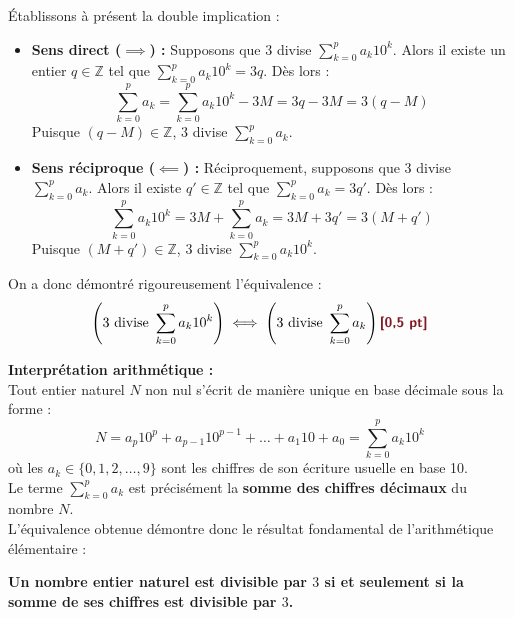 \documentclass[11pt,a4paper]{article}
\newcommand{\bareme}[1]{\hfill\textbf{\textcolor{secondary}{\sffamily[#1]}}}
\newcommand{\Z}{\mathbb{Z}}
\begin{document}
\begin{correctionbox}[Corrigé de l'Exercice 5 \bareme{Total : 4 points}]
\begin{enumerate}[label=\textbf{\arabic*.}]
    Établissons à présent la double implication :
    \begin{itemize}[leftmargin=*, label=$\bullet$]
        \item \textbf{Sens direct ($\implies$) :} Supposons que $3$ divise $\sum_{k=0}^p a_k 10^k$. Alors il existe un entier $q \in \Z$ tel que $\sum_{k=0}^p a_k 10^k = 3q$. Dès lors :
        \[
        \sum_{k=0}^p a_k = \sum_{k=0}^p a_k 10^k - 3M = 3q - 3M = 3(q - M)
        \]
        Puisque $(q - M) \in \Z$, $3$ divise $\sum_{k=0}^p a_k$.
        \item \textbf{Sens réciproque ($\impliedby$) :} Réciproquement, supposons que $3$ divise $\sum_{k=0}^p a_k$. Alors il existe $q' \in \Z$ tel que $\sum_{k=0}^p a_k = 3q'$. Dès lors :
        \[
        \sum_{k=0}^p a_k 10^k = 3M + \sum_{k=0}^p a_k = 3M + 3q' = 3(M + q')
        \]
        Puisque $(M + q') \in \Z$, $3$ divise $\sum_{k=0}^p a_k 10^k$.
    \end{itemize}
    On a donc démontré rigoureusement l'équivalence :
    \[
    \left( 3 \text{ divise } \sum_{k=0}^p a_k 10^k \right) \iff \left( 3 \text{ divise } \sum_{k=0}^p a_k \right) \bareme{0,5 pt}
    \]

    \textbf{Interprétation arithmétique :} \bareme{0,5 pt}\\
    Tout entier naturel $N$ non nul s'écrit de manière unique en base décimale sous la forme :
    \[
    N = a_p 10^p + a_{p-1} 10^{p-1} + \dots + a_1 10 + a_0 = \sum_{k=0}^p a_k 10^k
    \]
    où les $a_k \in \{0, 1, 2, \dots, 9\}$ sont les chiffres de son écriture usuelle en base 10.\\
    Le terme $\sum_{k=0}^p a_k$ est précisément la \textbf{somme des chiffres décimaux} du nombre $N$.\\
    L'équivalence obtenue démontre donc le résultat fondamental de l'arithmétique élémentaire :
    \begin{center}
    \textbf{\og Un nombre entier naturel est divisible par $3$ si et seulement si la somme de ses chiffres est divisible par $3$. \fg}
    \end{center}
\end{enumerate}
\end{correctionbox}
\end{document}
